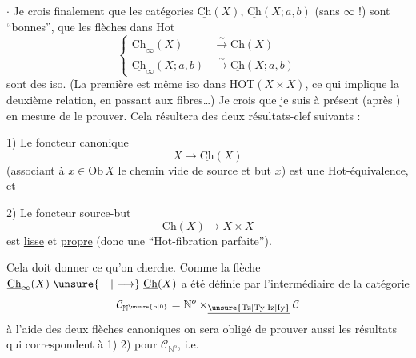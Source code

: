 $\cdot$ Je crois finalement que les catégories $\underline{\mathrm{Ch}}(X)$, $\underline{\mathrm{Ch}}(X;a,b)$ (sans  $\infty$ !) sont ``bonnes'', que les flèches  dans Hot
\[
\left\{\begin{aligned}
\underline{\mathrm{Ch}}_{\infty}(X)&\xrightarrow{\sim}\underline{\mathrm{Ch}}(X)\\
\underline{\mathrm{Ch}}_{\infty}(X;a,b)&\xrightarrow{\sim}\underline{\mathrm{Ch}}(X;a,b)
\end{aligned}\right.
\]
sont des iso. (La première est même iso dans $\mathrm{HOT}(X\times X)$, ce qui implique la deuxième relation, en passant aux fibres\ldots) Je crois que je suis à présent (après ) en mesure de le prouver. Cela résultera des deux résultats-clef suivants :

1) Le foncteur canonique
\[
X\longrightarrow\underline{\mathrm{Ch}}(X)
\]
(associant à  $x\in\mathrm{Ob}\,X$ le chemin vide de source et but $x$) est une Hot-équivalence, et

2) Le foncteur source-but
\[
\underline{\mathrm{Ch}}(X)\longrightarrow X\times X
\]
est \uline{lisse} et \uline{propre} (donc une ``Hot-fibration parfaite'').

Cela doit donner ce qu'on cherche. Comme la flèche $\underline{\mathrm{Ch}}_{\infty}(X)\mathrel{\unsure{\text{---}|\longrightarrow}}\underline{\mathrm{Ch}}(X)$  a été définie par l'intermédiaire  de la catégorie
\[
\mathcal C_{\mathbb N^{\unsure{o|0}}}=\mathbb N^o\times_{\underline{\unsure{\mathrm{Tz}|\mathrm{Ty}|\mathrm{Iz}|\mathrm{Iy}}}}\mathcal C
\]
à l'aide des deux flèches canoniques
on sera obligé de prouver aussi les résultats qui correspondent à 1) 2) pour $\mathcal C_{\mathbb N^o}$, i.e.

